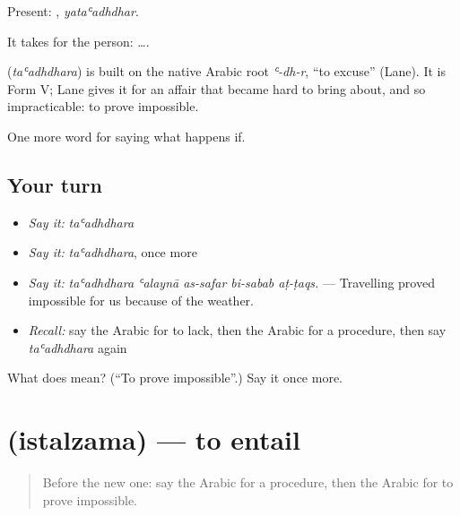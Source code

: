 Present: , \emph{yataʿadhdhar}.

It takes  for the person:   ….

\begin{cousinweb}
\textbf{} (\emph{taʿadhdhara}) is built on the native Arabic root \emph{ʿ-dh-r}, \textquotedblleft{}to excuse\textquotedblright{} (Lane). It is Form V; Lane gives it for an affair that became hard to bring about, and so impracticable: to prove impossible.
\end{cousinweb}

\begin{grammarlens}[title={What you've built}]
One more word for saying what happens if.
\end{grammarlens}

\subsection*{Your turn}
\begin{itemize}
\raggedright
  \item \emph{Say it:} \emph{taʿadhdhara}
  \item \emph{Say it:} \emph{taʿadhdhara}, once more
  \item \emph{Say it:} \emph{taʿadhdhara ʿalaynā as-safar bi-sabab aṭ-ṭaqs.} — Travelling proved impossible for us because of the weather.
  \item \emph{Recall:} say the Arabic for to lack, then the Arabic for a procedure, then say \emph{taʿadhdhara} again
\end{itemize}

\begin{tcolorbox}[breakable,colback=teal!4,colframe=teal!35!black,title={Before you move on}]
What does  mean? (\textquotedblleft{}To prove impossible\textquotedblright{}.) Say it once more.
\end{tcolorbox}
\section[\texorpdfstring{\ar{استلزم} (istalzama)}{استلزم (istalzama)}]{ (istalzama) — to entail}

\label{lesson:AR-C407-istalzama}



\begin{quote}
Before the new one: say the Arabic for a procedure, then the Arabic for to prove impossible.
\end{quote}

